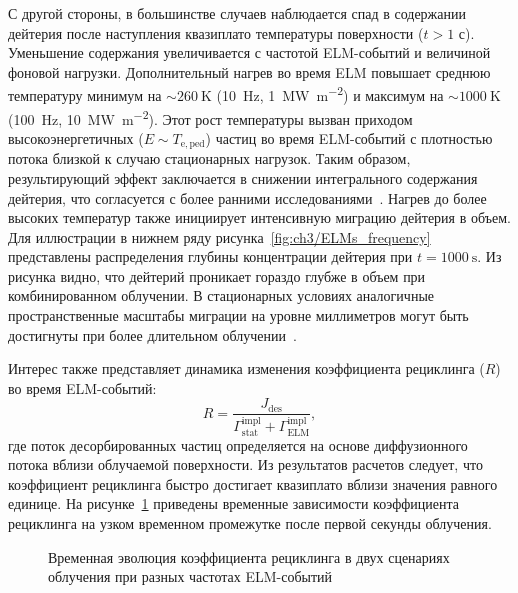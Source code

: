 С другой стороны, в большинстве случаев наблюдается спад в содержании дейтерия после наступления квазиплато температуры поверхности ($t>1$ с). Уменьшение содержания увеличивается с частотой ELM-событий и величиной фоновой нагрузки. Дополнительный нагрев во время ELM повышает среднюю температуру минимум на $\sim\SI{260}{\kelvin}$ (\SI{10}{\hertz}, \SI{1}{\mega\watt\per\meter\squared}) и максимум на $\sim\SI{1000}{\kelvin}$ (\SI{100}{\hertz}, \SI{10}{\mega\watt\per\meter\squared}). Этот рост температуры вызван приходом высокоэнергетичных ($E\sim T_{\mathrm{e,ped}}$) частиц во время ELM-событий с плотностью потока близкой к случаю стационарных нагрузок. Таким образом, результирующий эффект заключается в снижении интегрального содержания дейтерия, что согласуется с более ранними исследованиями~\cite{Hu2015}. Нагрев до более высоких температур также инициирует интенсивную миграцию дейтерия в объем. Для иллюстрации в нижнем ряду рисунка~\cref{fig:ch3/ELMs_frequency} представлены распределения глубины концентрации дейтерия при $t=\SI{1000}{\second}$. Из рисунка видно, что дейтерий проникает гораздо глубже в объем при комбинированном облучении. В стационарных условиях аналогичные пространственные масштабы миграции на уровне миллиметров могут быть достигнуты при более длительном облучении~\cite{Hodille2021}.

Интерес также представляет динамика изменения коэффициента рециклинга (\( R \)) во время ELM-событий:
\begin{equation}
	R = \frac{J_\mathrm{des}}{\Gamma^{\mathrm{impl}}_\mathrm{stat}+\Gamma^{\mathrm{impl}}_\mathrm{ELM}},
\end{equation}
где поток десорбированных частиц определяется на основе диффузионного потока вблизи облучаемой поверхности. Из результатов расчетов следует, что коэффициент рециклинга быстро достигает квазиплато вблизи значения равного единице. На рисунке~\cref{fig:ch3/R_freq} приведены временные зависимости коэффициента рециклинга на узком временном промежутке после первой секунды облучения.   
\begin{figure}[ht]
	\caption{Временная эволюция коэффициента рециклинга в двух сценариях облучения при разных частотах ELM-событий}\label{fig:ch3/R_freq}
\end{figure}

